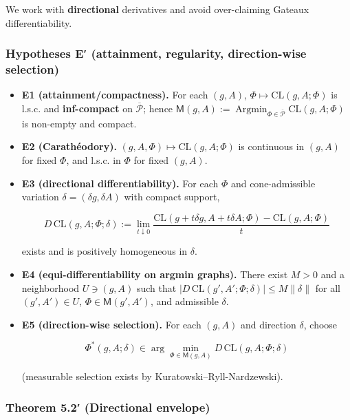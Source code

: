 \documentclass[
]{article}
\numberwithin{equation}{section}
\begin{document}
We work with \textbf{directional} derivatives and avoid over-claiming
Gateaux differentiability.

\hypertarget{hypotheses-e-attainment-regularity-direction-wise-selection}{%
\subsubsection{Hypotheses E′ (attainment, regularity, direction-wise
selection)}\label{hypotheses-e-attainment-regularity-direction-wise-selection}}

\begin{itemize}
\item
  \textbf{E1 (attainment/compactness).} For each \((g,A)\),
  \(\Phi\mapsto \mathrm{CL}(g,A;\Phi)\) is l.s.c. and
  \textbf{inf-compact} on \(\overline{\mathcal P}\); hence
  \(\mathsf M(g,A):=\operatorname{Argmin}_{\Phi\in\overline{\mathcal P}}\mathrm{CL}(g,A;\Phi)\)
  is non-empty and compact.
\item
  \textbf{E2 (Carathéodory).}
  \((g,A,\Phi)\mapsto \mathrm{CL}(g,A;\Phi)\) is continuous in \((g,A)\)
  for fixed \(\Phi\), and l.s.c. in \(\Phi\) for fixed \((g,A)\).
\item
  \textbf{E3 (directional differentiability).} For each \(\Phi\) and
  cone-admissible variation \(\delta=(\delta g,\delta A)\) with compact
  support,

  \[
  D\,\mathrm{CL}(g,A;\Phi;\delta):=\lim_{t\downarrow0}\frac{\mathrm{CL}(g+t\delta g,A+t\delta A;\Phi)-\mathrm{CL}(g,A;\Phi)}{t}
  \]

  exists and is positively homogeneous in \(\delta\).
\item
  \textbf{E4 (equi-differentiability on argmin graphs).} There exist
  \(M>0\) and a neighborhood \(U\ni(g,A)\) such that
  \(|D\,\mathrm{CL}(g',A';\Phi;\delta)|\le M\|\delta\|\) for all
  \((g',A')\in U\), \(\Phi\in\mathsf M(g',A')\), and admissible
  \(\delta\).
\item
  \textbf{E5 (direction-wise selection).} For each \((g,A)\) and
  direction \(\delta\), choose

  \[
  \Phi^*(g,A;\delta)\in\arg\min_{\Phi\in\mathsf M(g,A)} D\,\mathrm{CL}(g,A;\Phi;\delta)
  \]

  (measurable selection exists by Kuratowski--Ryll-Nardzewski).
\end{itemize}

\hypertarget{theorem-5.2-directional-envelope}{%
\subsubsection{Theorem 5.2′ (Directional
envelope)}\label{theorem-5.2-directional-envelope}}
\end{document}
